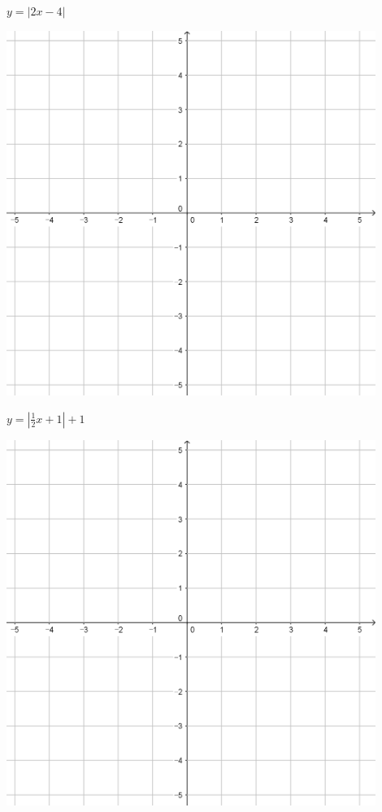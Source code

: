 \documentclass[a4paper]{oblivoir}
\begin{document}
\begin{minipage}{0.45\textwidth}\centering
\(y=|2x-4|\)
\par\bigskip\includegraphics[width=0.9\textwidth]{55}
\end{minipage}
\begin{minipage}{0.45\textwidth}\centering
\(y=|\frac12x+1|+1\)
\par\bigskip\includegraphics[width=0.9\textwidth]{55}
\end{minipage}\bigskip\bigskip\par
\end{document}
